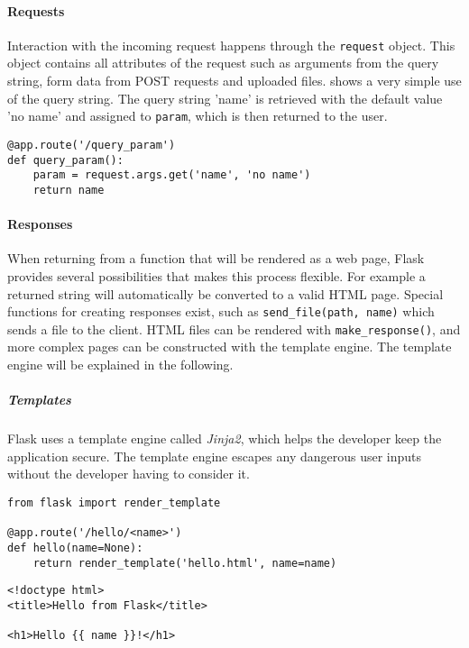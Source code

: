 \paragraph{Requests}
Interaction with the incoming request happens through the \texttt{request} object.
This object contains all attributes of the request such as arguments from the query string, form data from POST requests and uploaded files.
 shows a very simple use of the query string.
The query string 'name' is retrieved with the default value 'no name' and assigned to \texttt{param}, which is then returned to the user.

\begin{lstlisting}[style=python, caption={Simple use of the query string}, label={query_string}]
@app.route('/query_param')
def query_param():
    param = request.args.get('name', 'no name')
    return name
\end{lstlisting}

\paragraph{Responses}
When returning from a function that will be rendered as a web page, Flask provides several possibilities that makes this process flexible.
For example a returned string will automatically be converted to a valid HTML page.
Special functions for creating responses exist, such as \texttt{send\_file(path, name)} which sends a file to the client.
HTML files can be rendered with \texttt{make\_response()}, and more complex pages can be constructed with the template engine.
The template engine will be explained in the following.

\subparagraph{Templates}
Flask uses a template engine called \emph{Jinja2}, which helps the developer keep the application secure.
The template engine escapes any dangerous user inputs without the developer having to consider it.

\begin{lstlisting}[style=python, caption={Rendering a template that displays the name parameter}, label={template}]
from flask import render_template
  
@app.route('/hello/<name>')
def hello(name=None):
    return render_template('hello.html', name=name)
\end{lstlisting}

\begin{lstlisting}[style=python, caption={The Jinja2 template used by the hello example}, label={template_html}]
<!doctype html>
<title>Hello from Flask</title>

<h1>Hello {{ name }}!</h1>
\end{lstlisting}

